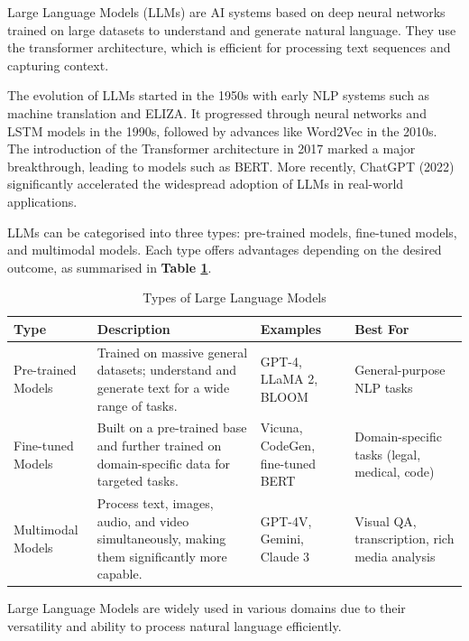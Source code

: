 Large Language Models (LLMs) are AI systems based on deep neural networks
trained on large datasets to understand and generate natural language.
They use the transformer architecture, which is efficient for processing
text sequences and capturing context.

The evolution of LLMs started in the 1950s with early NLP systems such as machine translation and ELIZA. It progressed through neural networks and LSTM models in the 1990s, followed by advances like Word2Vec in the 2010s. The introduction of the Transformer architecture in 2017 marked a major breakthrough, leading to models such as BERT. More recently, ChatGPT (2022) significantly accelerated the widespread adoption of LLMs in real-world applications.

LLMs can be categorised into three types: pre-trained models, fine-tuned
models, and multimodal models. Each type offers advantages depending on
the desired outcome, as summarised in  \textbf{Table \ref{tab:llm-types}}.
\begin{table}[H]
\centering
\caption{Types of Large Language Models}
\label{tab:llm-types}
\renewcommand{\arraystretch}{1.5}

\begin{tabular}{|p{3.5cm}|p{5cm}|p{3.5cm}|p{3.5cm}|}
\hline
\textbf{Type} & \textbf{Description} & \textbf{Examples} & \textbf{Best For} \\
\hline
Pre-trained Models &
Trained on massive general datasets; understand and generate text
for a wide range of tasks. &
GPT-4, LLaMA 2, BLOOM &
General-purpose NLP tasks \\
\hline

Fine-tuned Models &
Built on a pre-trained base and further trained on domain-specific
data for targeted tasks. &
Vicuna, CodeGen, fine-tuned BERT &
Domain-specific tasks (legal, medical, code) \\
\hline

Multimodal Models &
Process text, images, audio, and video simultaneously, making them
significantly more capable. &
GPT-4V, Gemini, Claude 3 &
Visual QA, transcription, rich media analysis \\
\hline
\end{tabular}
\end{table}


Large Language Models are widely used in various domains due to their
versatility and ability to process natural language efficiently.

